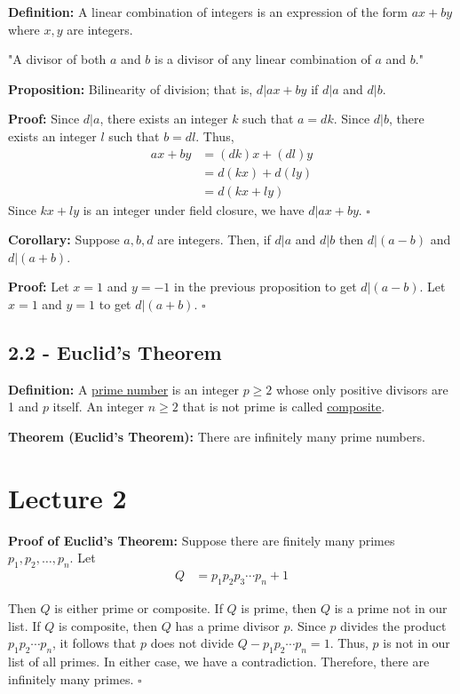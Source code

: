 \documentclass{article}
\newcommand*{\qed}{\hfill$\square$}%
\begin{document}
\textbf{Definition:} A linear combination of integers is an expression of the form $ax + by$ where $x,y$ are integers.

"A divisor of both $a$ and $b$ is a divisor of any linear combination of $a$ and $b$."

\textbf{Proposition:} Bilinearity of division; that is, $d|ax + by$ if $d|a$ and $d|b$.

\textbf{Proof:} Since $d|a$, there exists an integer $k$ such that $a = dk$. Since $d|b$, there exists an integer $l$ such that $b = dl$. Thus, \begin{align*}
    ax + by &= (dk)x + (dl)y \\
            &= d(kx) + d(ly) \\
            &= d(kx + ly)
\end{align*}
Since $kx + ly$ is an integer under field closure, we have $d|ax + by$. \qed

\textbf{Corollary:} Suppose $a,b,d$ are integers. Then, if $d|a$ and $d|b$ then $d|(a-b)$ and $d|(a+b)$.

\textbf{Proof:} Let $x = 1$ and $y = -1$ in the previous proposition to get $d|(a-b)$. Let $x = 1$ and $y = 1$ to get $d|(a+b)$. \qed

\subsection{2.2 - Euclid's Theorem}

\textbf{Definition:} A \underline{prime number} is an integer $p\geq 2$ whose only positive divisors are 1 and $p$ itself. An integer $n \geq 2$ that is not prime is called \underline{composite}. 

\textbf{Theorem (Euclid's Theorem):} There are infinitely many prime numbers.

\section{Lecture 2}

\textbf{Proof of Euclid's Theorem:} Suppose there are finitely many primes $p_1, p_2, \ldots, p_n$. Let \begin{align*}
    Q &= p_1 p_2 p_3 \cdots p_n + 1
\end{align*}

Then $Q$ is either prime or composite. If $Q$ is prime, then $Q$ is a prime not in our list. If $Q$ is composite, then $Q$ has a prime divisor $p$. Since $p$ divides the product $p_1 p_2 \cdots p_n$, it follows that $p$ does not divide $Q - p_1 p_2 \cdots p_n = 1$. Thus, $p$ is not in our list of all primes. In either case, we have a contradiction. Therefore, there are infinitely many primes. \qed
\end{document}
